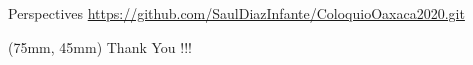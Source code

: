 \begin{frame}{Perspectives}
    \vspace*{5mm}
    \href{https://github.com/SaulDiazInfante/ColoquioOaxaca2020.git}{%
    https://github.com/SaulDiazInfante/ColoquioOaxaca2020.git
    }
    \begin{textblock*}{60mm}(75mm, 45mm)
        \Huge{Thank You !!!}
    \end{textblock*}
\end{frame}